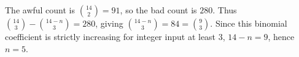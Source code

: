 The awful count is $\binom{14}2=91$, so the bad count is $280$. Thus $\binom{14}3-\binom{14-n}3=280$, giving $\binom{14-n}3=84=\binom93$. Since this binomial coefficient is strictly increasing for integer input at least 3, $14-n=9$, hence $\boxed{n=5}$.
